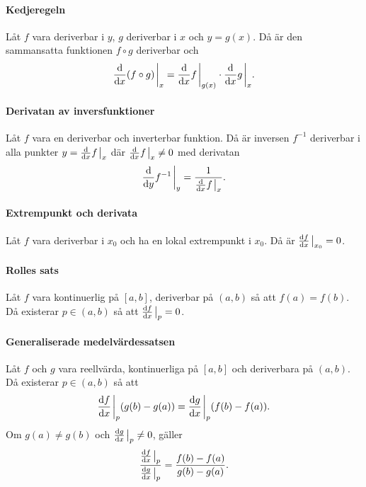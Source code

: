 \paragraph{Kedjeregeln}
Låt $f$ vara deriverbar i $y$, $g$ deriverbar i $x$ och $y = g(x)$. Då är den sammansatta funktionen $f\circ g$ deriverbar och
\begin{align*}
	\dv{x}(f\circ g)\eval_x = \dv{x}f\eval_{g(x)}\cdot\dv{x}g\eval_x.
\end{align*}

\proof

\paragraph{Derivatan av inversfunktioner}
Låt $f$ vara en deriverbar och inverterbar funktion. Då är inversen $f^{-1}$ deriverbar i alla punkter $y = \dv{x}f\eval_x$ där $\dv{x}f\eval_x\neq 0$ med derivatan
\begin{align*}
	\dv{y}f^{-1}\eval_y = \frac{1}{\dv{x}f\eval_x}.
\end{align*}

\proof

\paragraph{Extrempunkt och derivata}
Låt $f$ vara deriverbar i $x_0$ och ha en lokal extrempunkt i $x_0$. Då är $\dv{f}{x}\eval_{x_0} = 0$.

\proof

\paragraph{Rolles sats}
Låt $f$ vara kontinuerlig på $[a, b]$, deriverbar på $(a, b)$ så att $f(a) = f(b)$. Då existerar $p\in (a, b)$ så att $\dv{f}{x}\eval_p = 0$.

\proof

\paragraph{Generaliserade medelvärdessatsen}
Låt $f$ och $g$ vara reellvärda, kontinuerliga på $[a, b]$ och deriverbara på $(a, b)$. Då existerar $p\in (a, b)$ så att
\begin{align*}
	\dv{f}{x}\eval_p(g(b) - g(a)) = \dv{g}{x}\eval_p(f(b) - f(a)).
\end{align*}
Om $g(a)\neq g(b)$ och $\dv{g}{x}\eval_p\neq 0$, gäller
\begin{align*}
	\frac{\dv{f}{x}\eval_p}{\dv{g}{x}\eval_p} = \frac{f(b) - f(a)}{g(b) - g(a)}.
\end{align*}

